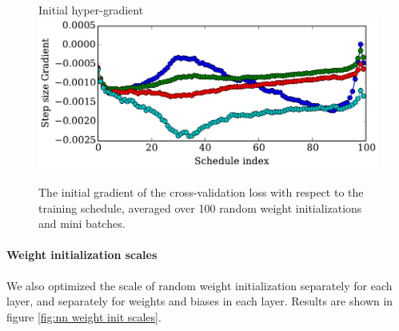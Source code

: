 \documentclass{article}
\begin{document}
\begin{figure}[h!]
\vskip 0.2in
\begin{center}
Initial hyper-gradient\\
\includegraphics[width=\columnwidth]{../experiments/Feb_3_training_schedules/5_initial_gradient/schedules_small.pdf}
\caption{The initial gradient of the cross-validation loss with respect to the training schedule, averaged over 100 random weight initializations and mini batches.}
\label{fig:optimal schedule}
\end{center}
\vskip -0.2in
\end{figure} 

\paragraph{Weight initialization scales}
We also optimized the scale of random weight initialization separately for each layer, and separately for weights and biases in each layer.
Results are shown in figure \ref{fig:nn weight init scales}.
\end{document}
